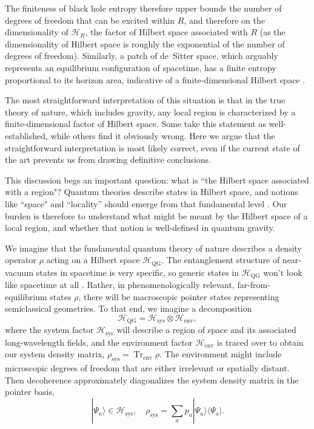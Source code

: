 \documentclass[12pt,english]{article}
\newcommand{\be}{\begin{equation}}
\newcommand{\ee}{\end{equation}}
\newcommand{\Tr}{\operatorname{Tr}}
\newcommand{\QG}{\mathrm{QG}}
\newcommand{\sys}{\mathrm{sys}}
\newcommand{\env}{\mathrm{env}}
\newcommand{\HH}{\mathcal{H}}
\begin{document}
The finiteness of black hole entropy therefore upper bounds the number of degrees of freedom that can be excited within $R$, and therefore on the dimensionality of $\HH_R$, the factor of Hilbert space associated with $R$ (as the dimensionality of Hilbert space is roughly the exponential of the number of degrees of freedom).
Similarly, a patch of de~Sitter space, which arguably represents an equilibrium configuration of spacetime, has a finite entropy proportional to its horizon area, indicative of a finite-dimensional Hilbert space \cite{Fischler2000,Banks2000,bousso2000,Banks:2000fe,Witten:2001kn,Dyson2002,Parikh:2004wh,Carroll:2017kjo}.

The most straightforward interpretation of this situation is that in the true theory of nature, which includes gravity, any local region is characterized by a finite-dimensional factor of Hilbert space.
Some take this statement as well-established, while others find it obviously wrong.
Here we argue that the straightforward interpretation is most likely correct, even if the current state of the art prevents us from drawing  definitive conclusions.

This discussion begs an important question: what is ``the Hilbert space associated with a region"?
Quantum theories describe states in Hilbert space, and notions like ``space" and ``locality'' should emerge from that fundamental level \cite{vanRaamsdonk2010,Cao:2016mst,Cotler:2017abq}.
Our burden is therefore to understand what might be meant by the Hilbert space of a local region, and whether that notion is well-defined in quantum gravity.

We imagine that the fundamental quantum theory of nature describes a density operator $\rho$ acting on a Hilbert space $\HH_\QG$.
The entanglement structure of near-vacuum states in spacetime is very specific, so generic states in $\HH_\QG$ won't look like spacetime at all \cite{Cao:2016mst,Cotler:2017abq}.
Rather, in phenomenologically relevant, far-from-equilibrium states $\rho$, there will be macroscopic pointer states representing semiclassical geometries.
To that end, we imagine a decomposition
\be
  \HH_\QG = \HH_\sys \otimes \HH_{\env},
\ee
where the system factor $\HH_\sys$ will describe a region of space and its associated long-wavelength fields, and the environment factor $\HH_\env$ is traced over to obtain our system density matrix, $\rho_\sys = \Tr_\env \rho$.
The environment might include microscopic degrees of freedom that are either irrelevant or spatially distant.
Then decoherence approximately diagonalizes the system density matrix in the pointer basis,
\be
  |\Psi_a\rangle \in \HH_\sys, \quad \rho_\sys = \sum_a p_a |\Psi_a\rangle\langle\Psi_a|.
\ee
\end{document}
